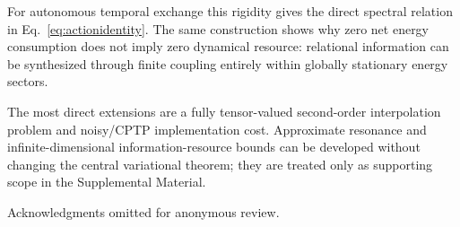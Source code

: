 \documentclass[aps,pra,preprint,nofootinbib]{revtex4-2}
\begin{document}
For autonomous temporal exchange this rigidity gives the direct spectral relation in Eq.~\eqref{eq:actionidentity}. The same construction shows why zero net energy consumption does not imply zero dynamical resource: relational information can be synthesized through finite coupling entirely within globally stationary energy sectors.

The most direct extensions are a fully tensor-valued second-order interpolation problem and noisy/CPTP implementation cost. Approximate resonance and infinite-dimensional information-resource bounds can be developed without changing the central variational theorem; they are treated only as supporting scope in the Supplemental Material.

\begin{acknowledgments}
Acknowledgments omitted for anonymous review.
\end{acknowledgments}


\end{document}
